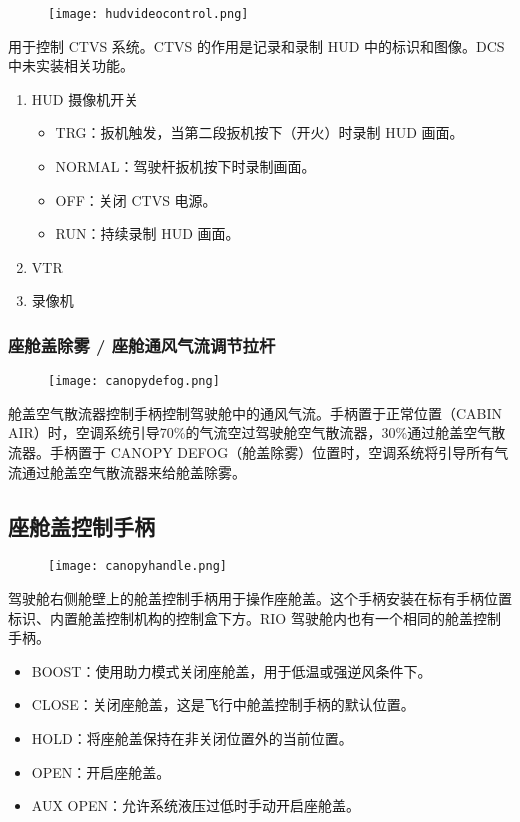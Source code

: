 \begin{figure}[htb]
	\centering
	\texttt{[image: hudvideocontrol.png]}
\end{figure}
用于控制 CTVS 系统。CTVS 的作用是记录和录制 HUD 中的标识和图像。DCS 中未实装相关功能。

\begin{enumerate}
	\item HUD 摄像机开关
	      \begin{itemize}
		      \item TRG：扳机触发，当第二段扳机按下（开火）时录制 HUD 画面。
		      \item NORMAL：驾驶杆扳机按下时录制画面。
		      \item OFF：关闭 CTVS 电源。
		      \item RUN：持续录制 HUD 画面。
	      \end{itemize}
	\item VTR
	\item 录像机
\end{enumerate}

\subsubsection{座舱盖除雾 / 座舱通风气流调节拉杆}

\begin{figure}[htb]
	\centering
	\texttt{[image: canopydefog.png]}
\end{figure}
舱盖空气散流器控制手柄控制驾驶舱中的通风气流。手柄置于正常位置（CABIN AIR）时，空调系统引导70\%的气流空过驾驶舱空气散流器，30\%通过舱盖空气散流器。手柄置于 CANOPY DEFOG（舱盖除雾）位置时，空调系统将引导所有气流通过舱盖空气散流器来给舱盖除雾。

\subsection{座舱盖控制手柄}

\begin{figure}[htb]
	\centering
	\texttt{[image: canopyhandle.png]}
\end{figure}
驾驶舱右侧舱壁上的舱盖控制手柄用于操作座舱盖。这个手柄安装在标有手柄位置标识、内置舱盖控制机构的控制盒下方。RIO 驾驶舱内也有一个相同的舱盖控制手柄。

\begin{itemize}
	\item BOOST：使用助力模式关闭座舱盖，用于低温或强逆风条件下。
	\item CLOSE：关闭座舱盖，这是飞行中舱盖控制手柄的默认位置。
	\item HOLD：将座舱盖保持在非关闭位置外的当前位置。
	\item OPEN：开启座舱盖。
	\item AUX OPEN：允许系统液压过低时手动开启座舱盖。
\end{itemize}

